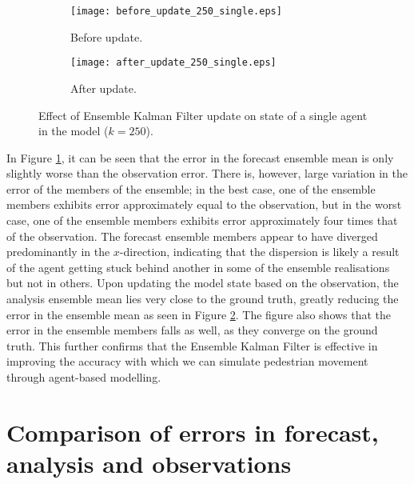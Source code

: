 \begin{figure}[h!]
    \centering
    \begin{subfigure}[h]{\textwidth}
        \texttt{[image: before\_update\_250\_single.eps]}
        \caption{Before update.}\label{fig:abm_before_single}
    \end{subfigure}

    \begin{subfigure}[h]{\textwidth}
        \texttt{[image: after\_update\_250\_single.eps]}
        \caption{After update.}\label{fig:abm_after_single}
    \end{subfigure}
    \caption[Effect of Ensemble Kalman Filter update on state of a single agent
    in the model.]{\centering Effect of Ensemble Kalman Filter update on state
    of a single agent in the model ($k=250$).}\label{fig:enkf_abm_single}
\end{figure}

In Figure \ref{fig:abm_before_single}, it can be seen that the error in the
forecast ensemble mean is only slightly worse than the observation error.
There is, however, large variation in the error of the members of the ensemble;
in the best case, one of the ensemble members exhibits error approximately equal
to the observation, but in the worst case, one of the ensemble members exhibits
error approximately four times that of the observation.
The forecast ensemble members appear to have diverged predominantly in the
$x$-direction, indicating that the dispersion is likely a result of the agent
getting stuck behind another in some of the ensemble realisations but not in
others.
Upon updating the model state based on the observation, the analysis ensemble
mean lies very close to the ground truth, greatly reducing the error in the
ensemble mean as seen in Figure \ref{fig:abm_after_single}.
The figure also shows that the error in the ensemble members falls as well, as
they converge on the ground truth.
This further confirms that the Ensemble Kalman Filter is effective in improving
the accuracy with which we can simulate pedestrian movement through agent-based
modelling.

\section{Comparison of errors in forecast, analysis and
observations}\label{sec:results:comparison}

